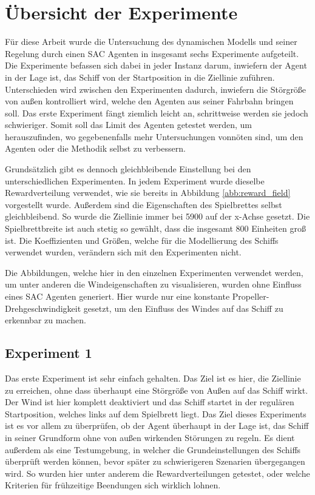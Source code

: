 \documentclass[]{iat}
\begin{document}
\section{Übersicht der Experimente}
Für diese Arbeit wurde die Untersuchung des dynamischen Modells und seiner Regelung durch einen SAC Agenten in insgesamt sechs Experimente aufgeteilt. Die Experimente befassen sich dabei in jeder Instanz darum, inwiefern der Agent in der Lage ist, das Schiff von der Startposition in die Ziellinie zuführen. Unterschieden wird zwischen den Experimenten dadurch, inwiefern die Störgröße von außen kontrolliert wird, welche den Agenten aus seiner Fahrbahn bringen soll. Das erste Experiment fängt ziemlich leicht an, schrittweise werden sie jedoch schwieriger. Somit soll das Limit des Agenten getestet werden, um herauszufinden, wo gegebenenfalls mehr Untersuchungen vonnöten sind, um den Agenten oder die Methodik selbst zu verbessern.

Grundsätzlich gibt es dennoch gleichbleibende Einstellung bei den unterschiedlichen Experimenten. In jedem Experiment wurde dieselbe Rewardverteilung verwendet, wie sie bereits in Abbildung \ref{abb:reward_field} vorgestellt wurde. Außerdem sind die Eigenschaften des Spielbrettes selbst gleichbleibend. So wurde die Ziellinie immer bei 5900 auf der x-Achse gesetzt. Die Spielbrettbreite ist auch stetig so gewählt, dass die insgesamt 800 Einheiten groß ist. Die Koeffizienten und Größen, welche für die Modellierung des Schiffs verwendet wurden, verändern sich mit den Experimenten nicht.

Die Abbildungen, welche hier in den einzelnen Experimenten verwendet werden, um unter anderen die Windeigenschaften zu visualisieren, wurden ohne Einfluss eines SAC Agenten generiert. Hier wurde nur eine konstante Propeller-Drehgeschwindigkeit gesetzt, um den Einfluss des Windes auf das Schiff zu erkennbar zu machen.

\subsection*{Experiment 1}
Das erste Experiment ist sehr einfach gehalten. Das Ziel ist es hier, die Ziellinie zu erreichen, ohne dass überhaupt eine Störgröße von Außen auf das Schiff wirkt. Der Wind ist hier komplett deaktiviert und das Schiff startet in der regulären Startposition, welches links auf dem Spielbrett liegt. Das Ziel dieses Experiments ist es vor allem zu überprüfen, ob der Agent überhaupt in der Lage ist, das Schiff in seiner Grundform ohne von außen wirkenden Störungen zu regeln. Es dient außerdem als eine Testumgebung, in welcher die Grundeinstellungen des Schiffs überprüft werden können, bevor später zu schwierigeren Szenarien übergegangen wird. So wurden hier unter anderem die Rewardverteilungen getestet, oder welche Kriterien für frühzeitige Beendungen sich wirklich lohnen.
\end{document}
